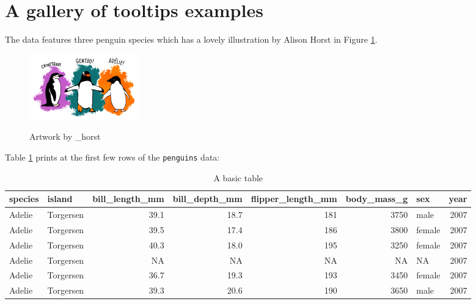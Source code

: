 \section{A gallery of tooltips examples}\label{a-gallery-of-tooltips-examples}

The  data \citep{palmerpenguins} features three
penguin species which has a lovely illustration by Alison Horst in
Figure \ref{fig:penguins-alison}.

\begin{figure}
\includegraphics[width=1\linewidth,height=0.3\textheight,alt={A picture of three different penguins with their species: Chinstrap, Gentoo, and Adelie. }]{figures/penguins} \caption{Artwork by \@allison\_horst}\label{fig:penguins-alison}
\end{figure}

Table
\ref{tab:penguins-tab-static}
prints at the first few rows of the \texttt{penguins} data:

\begin{table}
\centering
\caption{\label{tab:penguins-tab-static}A basic table}
\centering
\fontsize{7}{9}\selectfont
\begin{tabular}[t]{l|l|r|r|r|r|l|r}
\hline
species & island & bill\_length\_mm & bill\_depth\_mm & flipper\_length\_mm & body\_mass\_g & sex & year\\
\hline
Adelie & Torgersen & 39.1 & 18.7 & 181 & 3750 & male & 2007\\
\hline
Adelie & Torgersen & 39.5 & 17.4 & 186 & 3800 & female & 2007\\
\hline
Adelie & Torgersen & 40.3 & 18.0 & 195 & 3250 & female & 2007\\
\hline
Adelie & Torgersen & NA & NA & NA & NA & NA & 2007\\
\hline
Adelie & Torgersen & 36.7 & 19.3 & 193 & 3450 & female & 2007\\
\hline
Adelie & Torgersen & 39.3 & 20.6 & 190 & 3650 & male & 2007\\
\hline
\end{tabular}
\end{table}

